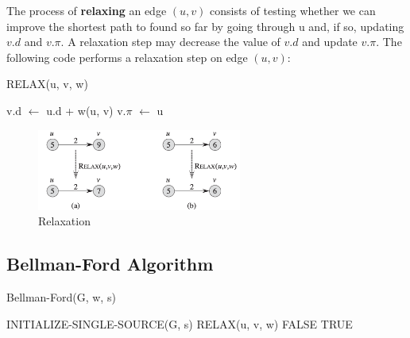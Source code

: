 \vspace{-1em}

The process of \textbf{relaxing} an edge $(u, v)$ consists of testing whether we can improve the shortest path to found so far by going through u and, if so, updating $v.d$ and $v.\pi$.
A relaxation step may decrease the value of $v.d$ and update $v.\pi$. The following code performs a relaxation step on edge $(u, v)$:

\begin{algorithm}[H]
    \caption{RELAX(u, v, w)}
    \begin{algorithmic}[1]
            \State v.d $\gets$ u.d + w(u, v)
            \State v.$\pi$ $\gets$ u
        \EndIf
    \end{algorithmic}
\end{algorithm}

\vspace{-1em}

\begin{figure}[H]
    \centering
    \includegraphics[width=0.6\textwidth]{assets/relaxation.png}
    \caption{Relaxation}
    \label{fig:relaxation}
\end{figure}

\vspace{-1em}

\subsection*{Bellman-Ford Algorithm}

\vspace{-1em}

\begin{algorithm}[H]
    \caption{Bellman-Ford(G, w, s)}
    \begin{algorithmic}[1]
        \State INITIALIZE-SINGLE-SOURCE(G, s)
                \State RELAX(u, v, w)
            \EndFor
        \EndFor
                \State \Return FALSE
            \EndIf
        \EndFor
        \State \Return TRUE
    \end{algorithmic}
\end{algorithm}

